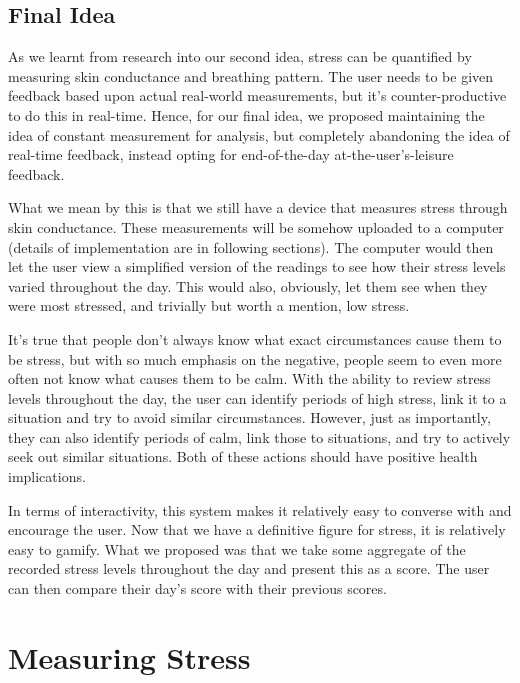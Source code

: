 \documentclass{scrartcl}
\begin{document}
\subsection{Final Idea}

As we learnt from research into our second idea, stress can be quantified by measuring skin conductance and breathing pattern.
The user needs to be given feedback based upon actual real-world measurements, but it's counter-productive to do this in
real-time. Hence, for our final idea, we proposed maintaining the idea of constant measurement for analysis,
but completely abandoning the idea of real-time feedback, instead opting for end-of-the-day at-the-user's-leisure feedback.

What we mean by this is that we still have a device that measures stress through skin conductance.
These measurements will be somehow uploaded
to a computer (details of implementation are in following sections). The computer would then let the user view a simplified version
of the readings to see how their stress levels varied throughout the day. This would also, obviously, let them see when
they were most stressed, and trivially but worth a mention, low stress.

It's true that people don't always know what exact circumstances cause them to be stress, but with so much emphasis on the
negative, people seem to even more often not know what causes them to be calm. With the ability to review stress levels throughout
the day, the user can identify periods of high stress, link it to a situation and try to avoid similar circumstances. However,
just as importantly, they can also identify periods of calm, link those to situations, and try to actively seek out
similar situations. Both of these actions should have positive health implications.

In terms of interactivity, this system makes it relatively easy to converse with and encourage the user. Now that we have
a definitive figure for stress, it is relatively easy to gamify. What we proposed was that we take some aggregate of the
recorded stress levels throughout the day and present this as a score. The user can then compare their day's score with their
previous scores.


\section{Measuring Stress}
\end{document}

